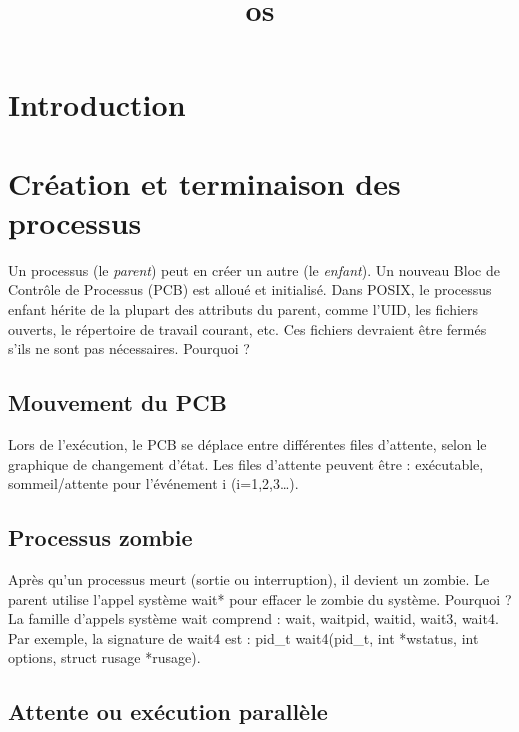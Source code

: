 \documentclass[12pt]{report}
\title{os}
\author{}
\begin{document}
\maketitle
\tableofcontents
\newpage

\section{Introduction}
\section{Création et terminaison des processus}

Un processus (le \textit{parent}) peut en créer un autre (le \textit{enfant}). Un nouveau Bloc de Contrôle de Processus (PCB) est alloué et initialisé. Dans POSIX, le processus enfant hérite de la plupart des attributs du parent, comme l'UID, les fichiers ouverts, le répertoire de travail courant, etc. Ces fichiers devraient être fermés s'ils ne sont pas nécessaires. Pourquoi ?

\subsection{Mouvement du PCB}

Lors de l'exécution, le PCB se déplace entre différentes files d'attente, selon le graphique de changement d'état. Les files d'attente peuvent être : exécutable, sommeil/attente pour l'événement i (i=1,2,3…).

\subsection{Processus zombie}

Après qu'un processus meurt (sortie ou interruption), il devient un zombie. Le parent utilise l'appel système wait* pour effacer le zombie du système. Pourquoi ? La famille d'appels système wait comprend : wait, waitpid, waitid, wait3, wait4. Par exemple, la signature de wait4 est : pid_t wait4(pid_t, int *wstatus, int options, struct rusage *rusage).

\subsection{Attente ou exécution parallèle}
\end{document}
